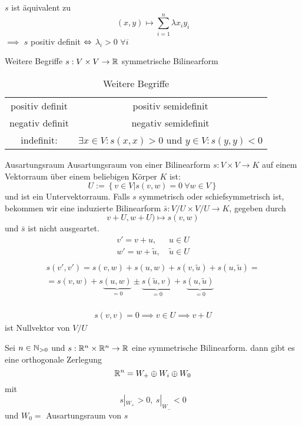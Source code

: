\begin{Bew}
  $s$ ist äquivalent zu 
  \[(x,y)\mapsto\sum^n_{i=1}\lambda x_iy_i\]
  $\implies$ $s$ positiv definit $\Leftrightarrow$ $\lambda_i >0$ $\forall i$
\end{Bew}
\begin{Bem}{Weitere Begriffe}
  $s:V\times V\to\mathbb{R}$ symmetrische Bilinearform
 \begin{table}[htb]
   \centering
   \begin{tabular}{cc}
     positiv definit & positiv semidefinit \\
     negativ definit & negativ semidefinit \\
     indefinit: & $\exists x\in V: s(x,x)> 0$ und $y\in V: s(y,y)<0$
   \end{tabular}
   \caption{Weitere Begriffe}
 \end{table}
\end{Bem}
\begin{Bem}{Ausartungsraum}
  Ausartungsraum von einer Bilinearform $s:V\times V\to K$ auf einem Vektorraum über einem beliebigen Körper $K$ ist:  
  \[U:=\left\{ v\in V|s(v,w)=0\ \forall w\in V \right\}\]
  und ist ein Untervektorraum. Falls $s$ symmetrisch oder schiefsymmetrisch ist, bekommen wir eine induzierte Bilinearform $\bar s:V/U\times V/U\to K$, gegeben durch
  \[v+U,w+U)\mapsto s(v,w)\]
  und $\bar s$ ist nicht ausgeartet.
  \begin{align*}
    v'=v+u, &\ u\in U\\
    w'=w+\tilde u, &\ \tilde u \in U\\
  \end{align*}
  \begin{gather*}
    s(v',v')=s(v,w)+s(u,w)+s(v,\tilde u)+s(u, \tilde u)=\\
    =s(v,w)+s\underbrace{(u,w)}_{=0} \pm \underbrace{s(\tilde u,v)}_{=0}+s\underbrace{(u,\tilde u)}_{=0}
  \end{gather*}
  \\
  \begin{gather*}
    s(v,v)=0 \implies v\in U \implies v+U
  \end{gather*}
  ist Nullvektor von $V/U$
\end{Bem}
\begin{Kor}
  Sei $n\in\mathbb{N}_{>0}$ und $s:\mathbb{R}^n\times\mathbb{R}^n\to\mathbb{R}$ eine symmetrische Bilinearform. dann gibt es eine orthogonale Zerlegung
  \[\mathbb{R}^n=W_+\oplus W_i\oplus W_0\]
  mit
  \[s|_{W_+}>0,\ s|_{W_-}<0\]
  und $W_0=$ Ausartungsraum von $s$
\end{Kor}

